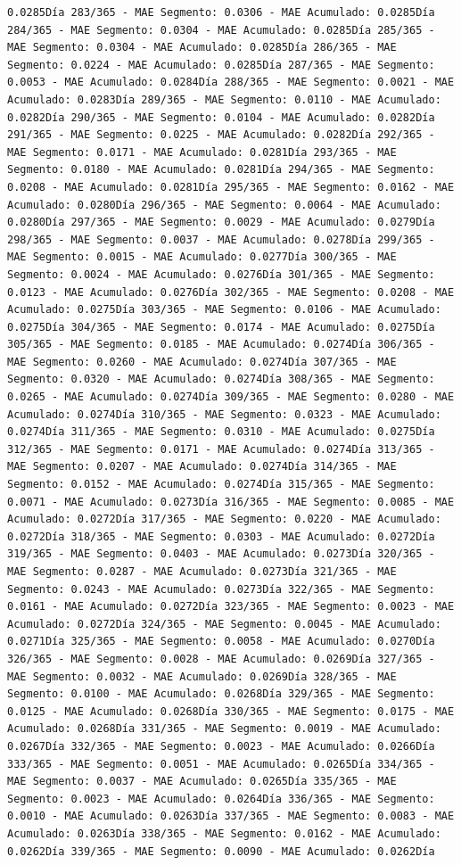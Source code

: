\documentclass[
]{book}
\begin{document}
\begin{verbatim}
0.0285Día 283/365 - MAE Segmento: 0.0306 - MAE Acumulado: 0.0285Día 284/365 - MAE Segmento: 0.0304 - MAE Acumulado: 0.0285Día 285/365 - MAE Segmento: 0.0304 - MAE Acumulado: 0.0285Día 286/365 - MAE Segmento: 0.0224 - MAE Acumulado: 0.0285Día 287/365 - MAE Segmento: 0.0053 - MAE Acumulado: 0.0284Día 288/365 - MAE Segmento: 0.0021 - MAE Acumulado: 0.0283Día 289/365 - MAE Segmento: 0.0110 - MAE Acumulado: 0.0282Día 290/365 - MAE Segmento: 0.0104 - MAE Acumulado: 0.0282Día 291/365 - MAE Segmento: 0.0225 - MAE Acumulado: 0.0282Día 292/365 - MAE Segmento: 0.0171 - MAE Acumulado: 0.0281Día 293/365 - MAE Segmento: 0.0180 - MAE Acumulado: 0.0281Día 294/365 - MAE Segmento: 0.0208 - MAE Acumulado: 0.0281Día 295/365 - MAE Segmento: 0.0162 - MAE Acumulado: 0.0280Día 296/365 - MAE Segmento: 0.0064 - MAE Acumulado: 0.0280Día 297/365 - MAE Segmento: 0.0029 - MAE Acumulado: 0.0279Día 298/365 - MAE Segmento: 0.0037 - MAE Acumulado: 0.0278Día 299/365 - MAE Segmento: 0.0015 - MAE Acumulado: 0.0277Día 300/365 - MAE Segmento: 0.0024 - MAE Acumulado: 0.0276Día 301/365 - MAE Segmento: 0.0123 - MAE Acumulado: 0.0276Día 302/365 - MAE Segmento: 0.0208 - MAE Acumulado: 0.0275Día 303/365 - MAE Segmento: 0.0106 - MAE Acumulado: 0.0275Día 304/365 - MAE Segmento: 0.0174 - MAE Acumulado: 0.0275Día 305/365 - MAE Segmento: 0.0185 - MAE Acumulado: 0.0274Día 306/365 - MAE Segmento: 0.0260 - MAE Acumulado: 0.0274Día 307/365 - MAE Segmento: 0.0320 - MAE Acumulado: 0.0274Día 308/365 - MAE Segmento: 0.0265 - MAE Acumulado: 0.0274Día 309/365 - MAE Segmento: 0.0280 - MAE Acumulado: 0.0274Día 310/365 - MAE Segmento: 0.0323 - MAE Acumulado: 0.0274Día 311/365 - MAE Segmento: 0.0310 - MAE Acumulado: 0.0275Día 312/365 - MAE Segmento: 0.0171 - MAE Acumulado: 0.0274Día 313/365 - MAE Segmento: 0.0207 - MAE Acumulado: 0.0274Día 314/365 - MAE Segmento: 0.0152 - MAE Acumulado: 0.0274Día 315/365 - MAE Segmento: 0.0071 - MAE Acumulado: 0.0273Día 316/365 - MAE Segmento: 0.0085 - MAE Acumulado: 0.0272Día 317/365 - MAE Segmento: 0.0220 - MAE Acumulado: 0.0272Día 318/365 - MAE Segmento: 0.0303 - MAE Acumulado: 0.0272Día 319/365 - MAE Segmento: 0.0403 - MAE Acumulado: 0.0273Día 320/365 - MAE Segmento: 0.0287 - MAE Acumulado: 0.0273Día 321/365 - MAE Segmento: 0.0243 - MAE Acumulado: 0.0273Día 322/365 - MAE Segmento: 0.0161 - MAE Acumulado: 0.0272Día 323/365 - MAE Segmento: 0.0023 - MAE Acumulado: 0.0272Día 324/365 - MAE Segmento: 0.0045 - MAE Acumulado: 0.0271Día 325/365 - MAE Segmento: 0.0058 - MAE Acumulado: 0.0270Día 326/365 - MAE Segmento: 0.0028 - MAE Acumulado: 0.0269Día 327/365 - MAE Segmento: 0.0032 - MAE Acumulado: 0.0269Día 328/365 - MAE Segmento: 0.0100 - MAE Acumulado: 0.0268Día 329/365 - MAE Segmento: 0.0125 - MAE Acumulado: 0.0268Día 330/365 - MAE Segmento: 0.0175 - MAE Acumulado: 0.0268Día 331/365 - MAE Segmento: 0.0019 - MAE Acumulado: 0.0267Día 332/365 - MAE Segmento: 0.0023 - MAE Acumulado: 0.0266Día 333/365 - MAE Segmento: 0.0051 - MAE Acumulado: 0.0265Día 334/365 - MAE Segmento: 0.0037 - MAE Acumulado: 0.0265Día 335/365 - MAE Segmento: 0.0023 - MAE Acumulado: 0.0264Día 336/365 - MAE Segmento: 0.0010 - MAE Acumulado: 0.0263Día 337/365 - MAE Segmento: 0.0083 - MAE Acumulado: 0.0263Día 338/365 - MAE Segmento: 0.0162 - MAE Acumulado: 0.0262Día 339/365 - MAE Segmento: 0.0090 - MAE Acumulado: 0.0262Día 
\end{verbatim}
\end{document}

